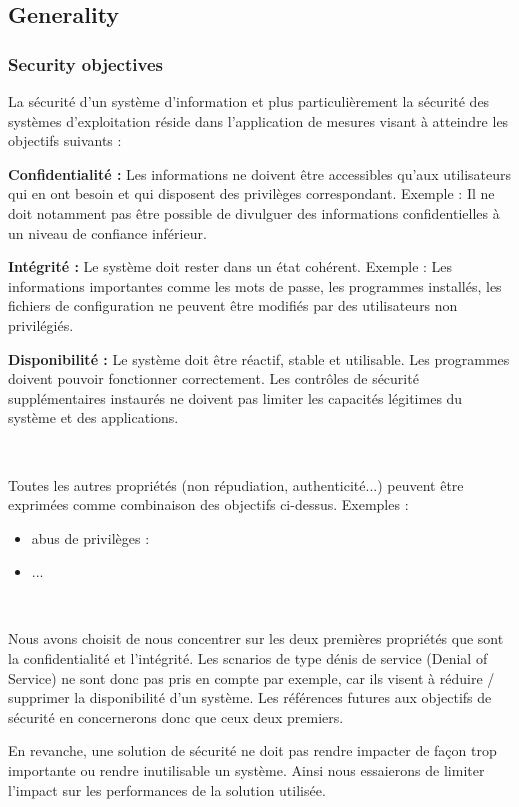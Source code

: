\documentclass[pdftex,a4paper,titlepage,11pt]{article}
\begin{document}
\subsection{Generality}

\subsubsection{Security objectives}

La sécurité d'un système d'information et plus particulièrement la sécurité des systèmes d'exploitation réside dans l'application de mesures visant à atteindre les objectifs suivants :

\textbf{Confidentialité :}
Les informations ne doivent être accessibles qu'aux utilisateurs qui en ont besoin et qui disposent des privilèges correspondant. Exemple : Il ne doit notamment pas être possible de divulguer des informations confidentielles à un niveau de confiance inférieur.

\textbf{Intégrité :}
Le système doit rester dans un état cohérent. Exemple : Les informations importantes comme les mots de passe, les programmes installés, les fichiers de configuration ne peuvent être modifiés par des utilisateurs non privilégiés.

\textbf{Disponibilité :}
Le système doit être réactif, stable et utilisable. Les programmes doivent pouvoir fonctionner correctement. Les contrôles de sécurité supplémentaires instaurés ne doivent pas limiter les capacités légitimes du système et des applications.

~

Toutes les autres propriétés (non répudiation, authenticité...) peuvent être exprimées comme combinaison des objectifs ci-dessus. Exemples :
\begin{itemize}
	\item abus de privilèges :
	\item ...
\end{itemize}

~

Nous avons choisit de nous concentrer sur les deux premières propriétés que sont la confidentialité et l'intégrité. Les scnarios de type dénis de service (Denial of Service) ne sont donc pas pris en compte par exemple, car ils visent à réduire / supprimer la disponibilité d'un système. Les références futures aux objectifs de sécurité en concernerons donc que ceux deux premiers.

En revanche, une solution de sécurité ne doit pas rendre impacter de façon trop importante ou rendre inutilisable un système. Ainsi nous essaierons de limiter l'impact sur les performances de la solution utilisée.
\end{document}
